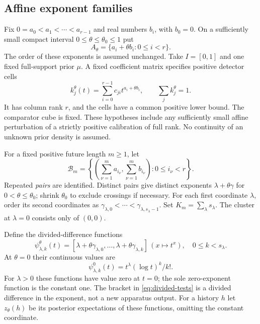\documentclass[11pt]{amsart}
\theoremstyle{definition}\newtheorem{definition}[theorem]{Definition}
\theoremstyle{remark}\newtheorem{remark}[theorem]{Remark}
\begin{document}
\subsection{Affine exponent families}
Fix $0=a_0<a_1<\cdots<a_{r-1}$ and real numbers $b_i$, with $b_0=0$.
On a sufficiently small compact interval $0\le\theta\le\theta_0\le1$ put
\[
 A_\theta=\{a_i+\theta b_i:0\le i<r\}.
\]
The order of these exponents is assumed unchanged. Take $I=[0,1]$ and
one fixed full-support prior $\mu$. A fixed coefficient matrix specifies
positive detector cells
\begin{equation}\label{eq:affine-calibration}
 k_j^\theta(t)=\sum_{i=0}^{r-1}c_{ji}t^{a_i+\theta b_i},
 \qquad \sum_jk_j^\theta=1.
\end{equation}
It has column rank $r$, and the cells have a common positive lower bound.
The comparator cube is fixed. These hypotheses include any sufficiently
small affine perturbation of a strictly positive calibration of full rank.
No continuity of an unknown prior density is assumed.

For a fixed positive future length $m\ge1$, let
\[
 \mathcal B_m=\left\{\left(\sum_{\nu=1}^m a_{i_\nu},
                              \sum_{\nu=1}^m b_{i_\nu}\right):
                              0\le i_\nu<r\right\}.
\]
Repeated \emph{pairs} are identified. Distinct pairs give distinct
exponents $\lambda+\theta\gamma$ for $0<\theta\le\theta_0$; shrink
$\theta_0$ to exclude crossings if necessary. For each first coordinate
$\lambda$, order its second coordinates as
$\gamma_{\lambda,0}<\cdots<\gamma_{\lambda,s_\lambda-1}$.
Set $K_m=\sum_\lambda s_\lambda$. The cluster at $\lambda=0$ consists
only of $(0,0)$.

Define the divided-difference functions
\begin{equation}\label{eq:divided-tests}
 \psi_{\lambda,k}^\theta(t)
  =[\lambda+\theta\gamma_{\lambda,0},\ldots,
       \lambda+\theta\gamma_{\lambda,k}]\,(x\mapsto t^x),
 \quad 0\le k<s_\lambda.
\end{equation}
At $\theta=0$ their continuous values are
\begin{equation}\label{eq:jet-tests}
 \psi_{\lambda,k}^0(t)=t^\lambda(\log t)^k/k!.
\end{equation}
For $\lambda>0$ these functions have value zero at $t=0$; the sole
zero-exponent function is the constant one. The bracket in
\eqref{eq:divided-tests} is a divided difference in the exponent, not a
new apparatus output. For a history $h$ let $z_\theta(h)$ be its posterior
expectations of these functions, omitting the constant coordinate.
\end{document}
